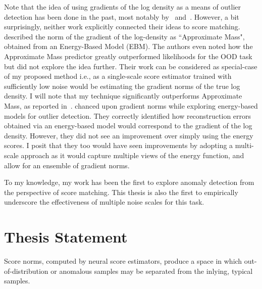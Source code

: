 Note that the idea of using gradients of the log density as a means of outlier detection has been done in the past, most notably by~\cite{Grathwohl2020Your} and~\cite{pmlr-v48-zhai16}. However, a bit surprisingly, neither work explicitly connected their ideas to score matching. \cite{Grathwohl2020Your} described the norm of the gradient of the log-density as ``Approximate Mass", obtained from an Energy-Based Model (EBM). The authors even noted how the Approximate Mass predictor greatly outperformed likelihoods for the OOD task but did not explore the idea further. Their work can be considered as special-case of my proposed method i.e., as a single-scale score estimator trained with sufficiently low noise would be estimating the gradient norms of the true log density. I will note that my technique significantly outperforms Approximate Mass, as reported in~\cite{mahmood2021multiscale}. \cite{pmlr-v48-zhai16} chanced upon gradient norms while exploring energy-based models for outlier detection. They correctly identified how reconstruction errors obtained via an energy-based model would correspond to the gradient of the log density. However, they did not see an improvement over simply using the energy scores. I posit that they too would have seen improvements by adopting a multi-scale approach as it would capture multiple views of the energy function, and allow for an ensemble of gradient norms. 

To my knowledge, my work has been the first to explore anomaly detection from the perspective of score matching. This thesis is also the first to empirically underscore the effectiveness of multiple noise scales for this task.

\section{Thesis Statement}

Score norms, computed by neural score estimators, produce a space in which out-of-distribution or anomalous samples may be separated from the inlying, typical samples.
